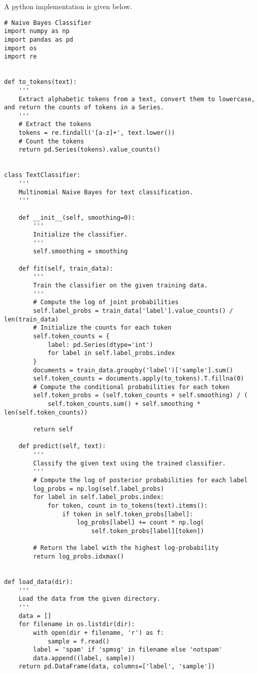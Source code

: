 \begin{solution}
    A python implementation is given below.
    \begin{verbatim}
# Naive Bayes Classifier
import numpy as np
import pandas as pd
import os
import re


def to_tokens(text):
    '''
    Extract alphabetic tokens from a text, convert them to lowercase, and return the counts of tokens in a Series.
    '''
    # Extract the tokens
    tokens = re.findall('[a-z]+', text.lower())
    # Count the tokens
    return pd.Series(tokens).value_counts()


class TextClassifier:
    '''
    Multinomial Naive Bayes for text classification.
    '''

    def __init__(self, smoothing=0):
        '''
        Initialize the classifier.
        '''
        self.smoothing = smoothing

    def fit(self, train_data):
        '''
        Train the classifier on the given training data.
        '''
        # Compute the log of joint probabilities
        self.label_probs = train_data['label'].value_counts() / len(train_data)
        # Initialize the counts for each token
        self.token_counts = {
            label: pd.Series(dtype='int')
            for label in self.label_probs.index
        }
        documents = train_data.groupby('label')['sample'].sum()
        self.token_counts = documents.apply(to_tokens).T.fillna(0)
        # Compute the conditional probabilities for each token
        self.token_probs = (self.token_counts + self.smoothing) / (
            self.token_counts.sum() + self.smoothing * len(self.token_counts))

        return self

    def predict(self, text):
        '''
        Classify the given text using the trained classifier.
        '''
        # Compute the log of posterior probabilities for each label
        log_probs = np.log(self.label_probs)
        for label in self.label_probs.index:
            for token, count in to_tokens(text).items():
                if token in self.token_probs[label]:
                    log_probs[label] += count * np.log(
                        self.token_probs[label][token])

        # Return the label with the highest log-probability
        return log_probs.idxmax()


def load_data(dir):
    '''
    Load the data from the given directory.
    '''
    data = []
    for filename in os.listdir(dir):
        with open(dir + filename, 'r') as f:
            sample = f.read()
        label = 'spam' if 'spmsg' in filename else 'notspam'
        data.append((label, sample))
    return pd.DataFrame(data, columns=['label', 'sample'])



\end{verbatim}
\end{solution}
